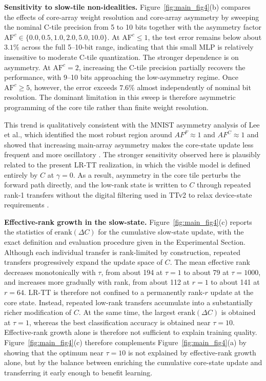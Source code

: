\documentclass[AMA,LATO2COL]{WileyNJDv5}
\begin{document}
\noindent\textbf{Sensitivity to slow-tile non-idealities.}
Figure~\ref{fig:main_fig4}(b) compares the effects of core-array weight resolution and core-array asymmetry by sweeping the nominal C-tile precision from 5 to 10 bits together with the asymmetry factor \(\mathrm{AF}^{c}\in\{0.0,0.5,1.0,2.0,5.0,10.0\}\). At \(\mathrm{AF}^{c}\leq 1\), the test error remains below about \(3.1\%\) across the full 5--10-bit range, indicating that this small MLP is relatively insensitive to moderate C-tile quantization. The stronger dependence is on asymmetry. At \(\mathrm{AF}^{c}=2\), increasing the C-tile precision partially recovers the performance, with 9--10 bits approaching the low-asymmetry regime. Once \(\mathrm{AF}^{c}\geq 5\), however, the error exceeds \(7.6\%\) almost independently of nominal bit resolution. The dominant limitation in this sweep is therefore asymmetric programming of the core tile rather than finite weight resolution.

\noindent
This trend is qualitatively consistent with the MNIST asymmetry analysis of Lee et al., which identified the most robust region around $AF^{F}\approx1$ and $AF^{C}\approx1$ and showed that increasing main-array asymmetry makes the core-state update less frequent and more oscillatory \cite{lee2022tikitaka_asymmetry}. The stronger sensitivity observed here is plausibly related to the present LR-TT realization, in which the visible model is defined entirely by $C$ at $\gamma=0$. As a result, asymmetry in the core tile perturbs the forward path directly, and the low-rank state is written to $C$ through repeated rank-1 transfers without the digital filtering used in TTv2 to relax device-state requirements \cite{rasch2024fastrobust}. 

\noindent\textbf{Effective-rank growth in the slow-state.}
Figure~\ref{fig:main_fig4}(c) reports the statistics of \(\mathrm{erank}(\Delta C)\) for the cumulative slow-state update, with the exact definition and evaluation procedure given in the Experimental Section. Although each individual transfer is rank-limited by construction, repeated transfers progressively expand the update space of \(C\). The mean effective rank decreases monotonically with \(\tau\), from about 194 at \(\tau=1\) to about 79 at \(\tau=1000\), and increases more gradually with rank, from about 112 at \(r=1\) to about 141 at \(r=64\). LR-TT is therefore not confined to a permanently rank-\(r\) update at the core state. Instead, repeated low-rank transfers accumulate into a substantially richer modification of \(C\). At the same time, the largest \(\mathrm{erank}(\Delta C)\) is obtained at \(\tau=1\), whereas the best classification accuracy is obtained near \(\tau=10\). Effective-rank growth alone is therefore not sufficient to explain training quality. Figure~\ref{fig:main_fig4}(c) therefore complements Figure~\ref{fig:main_fig4}(a) by showing that the optimum near $\tau=10$ is not explained by effective-rank growth alone, but by the balance between enriching the cumulative core-state update and transferring it early enough to benefit learning. 
\end{document}
